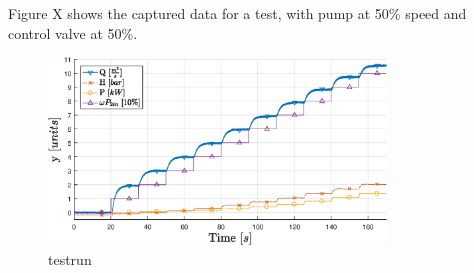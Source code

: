 Figure X shows the captured data for a test, with pump at 50\% speed and control valve at 50\%.

\begin{figure}[ht]
	\centering
	\includegraphics[width=0.8\textwidth]{figures/04ExperimentsAndLabWork/testrun.eps}
	\caption{testrun}
	\label{fig:testrun}
\end{figure}

